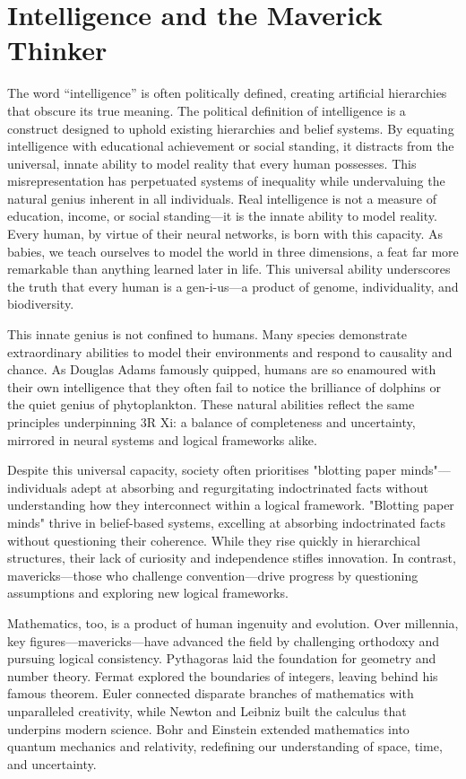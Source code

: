 \documentclass[12pt]{article}
\begin{document}
\section*{Intelligence and the Maverick Thinker}

The word “intelligence” is often politically defined, creating artificial hierarchies that obscure its true meaning. The political definition of intelligence is a construct designed to uphold existing hierarchies and belief systems. By equating intelligence with educational achievement or social standing, it distracts from the universal, innate ability to model reality that every human possesses. This misrepresentation has perpetuated systems of inequality while undervaluing the natural genius inherent in all individuals. Real intelligence is not a measure of education, income, or social standing—it is the innate ability to model reality. Every human, by virtue of their neural networks, is born with this capacity. As babies, we teach ourselves to model the world in three dimensions, a feat far more remarkable than anything learned later in life. This universal ability underscores the truth that every human is a gen-i-us—a product of genome, individuality, and biodiversity.

This innate genius is not confined to humans. Many species demonstrate extraordinary abilities to model their environments and respond to causality and chance. As Douglas Adams famously quipped, humans are so enamoured with their own intelligence that they often fail to notice the brilliance of dolphins or the quiet genius of phytoplankton. These natural abilities reflect the same principles underpinning 3R Xi: a balance of completeness and uncertainty, mirrored in neural systems and logical frameworks alike.

Despite this universal capacity, society often prioritises "blotting paper minds"—individuals adept at absorbing and regurgitating indoctrinated facts without understanding how they interconnect within a logical framework. "Blotting paper minds" thrive in belief-based systems, excelling at absorbing indoctrinated facts without questioning their coherence. While they rise quickly in hierarchical structures, their lack of curiosity and independence stifles innovation. In contrast, mavericks—those who challenge convention—drive progress by questioning assumptions and exploring new logical frameworks.

Mathematics, too, is a product of human ingenuity and evolution. Over millennia, key figures—mavericks—have advanced the field by challenging orthodoxy and pursuing logical consistency. Pythagoras laid the foundation for geometry and number theory. Fermat explored the boundaries of integers, leaving behind his famous theorem. Euler connected disparate branches of mathematics with unparalleled creativity, while Newton and Leibniz built the calculus that underpins modern science. Bohr and Einstein extended mathematics into quantum mechanics and relativity, redefining our understanding of space, time, and uncertainty.
\end{document}
